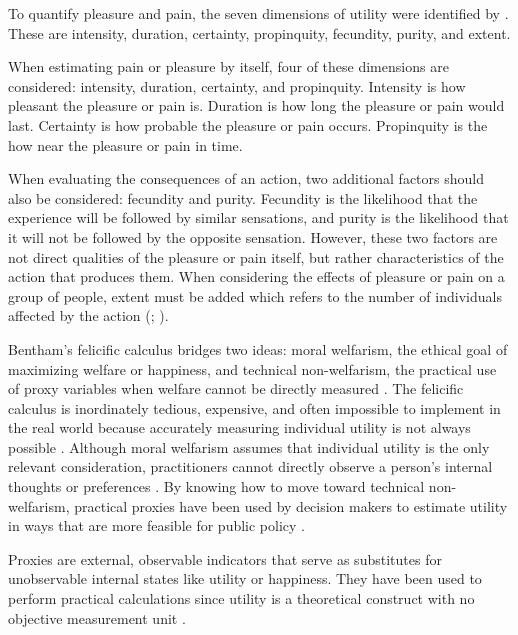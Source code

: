 \documentclass{icsthesis}
\begin{document}
\begin{mainmatter}
To quantify pleasure and pain, the seven dimensions of utility were identified by \citet{Bentham1907}. These are intensity, duration, certainty, propinquity, fecundity, purity, and extent. 

When estimating pain or pleasure by itself, four of these dimensions are considered: intensity, duration, certainty, and propinquity. Intensity is how pleasant the pleasure or pain is. Duration is how long the pleasure or pain would last. Certainty is how probable the pleasure or pain occurs. Propinquity is the how near the pleasure or pain in time.

When evaluating the consequences of an action, two additional factors should also be considered: fecundity and purity. Fecundity is the likelihood that the experience will be followed by similar sensations, and purity is the likelihood that it will not be followed by the opposite sensation. However, these two factors are not direct qualities of the pleasure or pain itself, but rather characteristics of the action that produces them. When considering the effects of pleasure or pain on a group of people, extent must be added which refers to the number of individuals affected by the action (\citealp{Bentham1907}; \citealp{Sprigge1999}).

Bentham’s felicific calculus bridges two ideas: moral welfarism, the ethical goal of maximizing welfare or happiness, and technical non-welfarism, the practical use of proxy variables when welfare cannot be directly measured \citep{Baujard2006}. The felicific calculus is inordinately tedious, expensive, and often impossible to implement in the real world because accurately measuring individual utility is not always possible \citep{Baujard2006}. Although moral welfarism assumes that individual utility is the only relevant consideration, practitioners cannot directly observe a person’s internal thoughts or preferences \citep{Baujard2006}. By knowing how to move toward technical non-welfarism, practical proxies have been used by decision makers to estimate utility in ways that are more feasible for public policy \citep{Baujard2006}. 

Proxies are external, observable indicators that serve as substitutes for unobservable internal states like utility or happiness. They have been used to perform practical calculations since utility is a theoretical construct with no objective measurement unit \citep{Li2002}.


\end{mainmatter}
\end{document}
